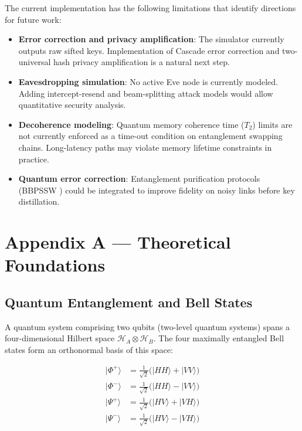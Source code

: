\documentclass[12pt,oneside,letterpaper,english]{article}
\begin{document}
The current implementation has the following limitations that identify directions for future work:
\begin{itemize}
    \item \textbf{Error correction and privacy amplification}: The simulator currently outputs raw sifted keys. Implementation of Cascade error correction and two-universal hash privacy amplification is a natural next step.
    \item \textbf{Eavesdropping simulation}: No active Eve node is currently modeled. Adding intercept-resend and beam-splitting attack models would allow quantitative security analysis.
    \item \textbf{Decoherence modeling}: Quantum memory coherence time ($T_2$) limits are not currently enforced as a time-out condition on entanglement swapping chains. Long-latency paths may violate memory lifetime constraints in practice.
    \item \textbf{Quantum error correction}: Entanglement purification protocols (BBPSSW \cite{BBPSSW}) could be integrated to improve fidelity on noisy links before key distillation.
\end{itemize}

\newpage
\appendix

\section{Appendix A --- Theoretical Foundations}
\label{app:theory}

\subsection{Quantum Entanglement and Bell States}

A quantum system comprising two qubits (two-level quantum systems) spans a four-dimensional Hilbert space $\mathcal{H}_A \otimes \mathcal{H}_B$. The four maximally entangled Bell states form an orthonormal basis of this space:

\begin{align}
    |\Phi^+\rangle &= \frac{1}{\sqrt{2}}\bigl(|HH\rangle + |VV\rangle\bigr) \\
    |\Phi^-\rangle &= \frac{1}{\sqrt{2}}\bigl(|HH\rangle - |VV\rangle\bigr) \\
    |\Psi^+\rangle &= \frac{1}{\sqrt{2}}\bigl(|HV\rangle + |VH\rangle\bigr) \\
    |\Psi^-\rangle &= \frac{1}{\sqrt{2}}\bigl(|HV\rangle - |VH\rangle\bigr)
\end{align}
\end{document}
